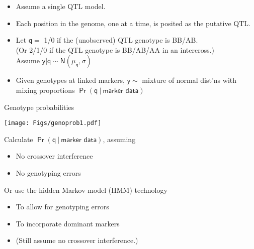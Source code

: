 \documentclass[12pt]{article}
\newcommand{\headsize}{\fontsize{35}{35} \selectfont}
\newcommand{\smallersize}{\fontsize{20}{25} \selectfont}
\begin{document}
\smallersize
\hfill \begin{minipage}{9.5in}
\begin{itemize}
\itemsep24pt
\setlength{\rightskip}{0pt plus 1fil} %
  \item Assume a {\color{mypink} single} QTL model.
  \item Each position in the genome, one at a time, is posited as the
  putative QTL.
  \item Let $\mathsf{q = }$ 1/0 if the (unobserved) QTL genotype is
  BB/AB. \\[12pt]
  {\color{myblue} (Or 2/1/0 if the QTL genotype is BB/AB/AA in an intercross.)} \\[12pt]
        Assume $\mathsf{y | q \sim N(\mu_q, \sigma)}$
  \item Given genotypes at linked markers, $\mathsf{y \sim}$ mixture of normal
  dist'ns with mixing proportions $\mathsf{\Pr(q \ | \ \text{marker data})}$
\end{itemize}
\end{minipage}



\newpage

\headsize \color{myyellow}
\hfill \begin{minipage}{5.75in}
\centering
Genotype probabilities
\end{minipage}

\vspace{15mm}

\centerline{\texttt{[image: Figs/genoprob1.pdf]}}

\vspace{15mm}

\hfill
\begin{minipage}{10in}
\color{mywhite} \smallersize
Calculate {\color{myblue} $\mathsf{\Pr(q \ | \ \text{marker data})}$}, assuming
\begin{itemize}
\item No crossover interference
\item No genotyping errors
\end{itemize}

\vspace{10mm}

Or use the {\color{mypink} hidden Markov model (HMM)} technology
\begin{itemize}
\item To allow for genotyping errors
\item To incorporate dominant markers
\item {\color{myblue} (Still assume no crossover interference.)}
\end{itemize}
\end{minipage}
\end{document}
